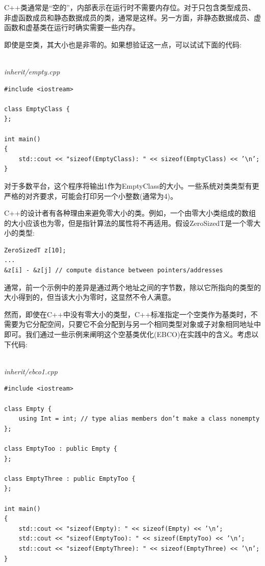 
C++类通常是“空的”，内部表示在运行时不需要内存位。对于只包含类型成员、非虚函数成员和静态数据成员的类，通常是这样。另一方面，非静态数据成员、虚函数和虚基类在运行时确实需要一些内存。

即使是空类，其大小也是非零的。如果想验证这一点，可以试试下面的代码:

\hspace*{\fill} \\ %
\noindent
\textit{inherit/empty.cpp}
\begin{lstlisting}[style=styleCXX]
#include <iostream>

class EmptyClass {
};

int main()
{
	std::cout << "sizeof(EmptyClass): " << sizeof(EmptyClass) << ’\n’;
}
\end{lstlisting}

对于多数平台，这个程序将输出1作为EmptyClass的大小。一些系统对类类型有更严格的对齐要求，可能会打印另一个小整数(通常为4)。


C++的设计者有各种理由来避免零大小的类。例如，一个由零大小类组成的数组的大小应该也为零，但是指针算法的属性将不再适用。假设ZeroSizedT是一个零大小的类型:

\begin{lstlisting}[style=styleCXX]
ZeroSizedT z[10];
...
&z[i] - &z[j] // compute distance between pointers/addresses
\end{lstlisting}

通常，前一个示例中的差异是通过两个地址之间的字节数，除以它所指向的类型的大小得到的，但当该大小为零时，这显然不令人满意。

然而，即使在C++中没有零大小的类型，C++标准指定一个空类作为基类时，不需要为它分配空间，只要它不会分配到与另一个相同类型对象或子对象相同地址中即可。我们通过一些示例来阐明这个空基类优化(EBCO)在实践中的含义。考虑以下代码:

\hspace*{\fill} \\ %
\noindent
\textit{inherit/ebco1.cpp}
\begin{lstlisting}[style=styleCXX]
#include <iostream>

class Empty {
	using Int = int; // type alias members don’t make a class nonempty
};

class EmptyToo : public Empty {
};

class EmptyThree : public EmptyToo {
};

int main()
{
	std::cout << "sizeof(Empty): " << sizeof(Empty) << ’\n’;
	std::cout << "sizeof(EmptyToo): " << sizeof(EmptyToo) << ’\n’;
	std::cout << "sizeof(EmptyThree): " << sizeof(EmptyThree) << ’\n’;
}
\end{lstlisting}

